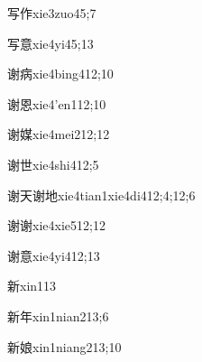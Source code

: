 \begin{verbete}{写作}{xie3zuo4}{5;7}
\end{verbete}

\begin{verbete}{写意}{xie4yi4}{5;13}
\end{verbete}

\begin{verbete}{谢病}{xie4bing4}{12;10}
\end{verbete}

\begin{verbete}{谢恩}{xie4'en1}{12;10}
\end{verbete}

\begin{verbete}{谢媒}{xie4mei2}{12;12}
\end{verbete}

\begin{verbete}{谢世}{xie4shi4}{12;5}
\end{verbete}

\begin{verbete}{谢天谢地}{xie4tian1xie4di4}{12;4;12;6}
\end{verbete}

\begin{verbete}{谢谢}{xie4xie5}{12;12}
\end{verbete}

\begin{verbete}{谢意}{xie4yi4}{12;13}
\end{verbete}

\begin{verbete}{新}{xin1}{13}
\end{verbete}

\begin{verbete}{新年}{xin1nian2}{13;6}
\end{verbete}

\begin{verbete}{新娘}{xin1niang2}{13;10}
\end{verbete}

